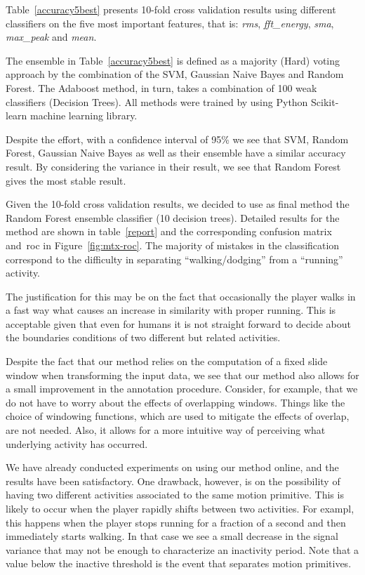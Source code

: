 Table~\ref{accuracy5best} presents 10-fold cross validation results using different classifiers on the five most important features, that is: \textit{rms}, \textit{fft\_energy}, \textit{sma}, \textit{max\_peak} and \textit{mean}. 

The ensemble in Table~\ref{accuracy5best} is defined as a majority (Hard) voting approach by the combination of the SVM, Gaussian Naive Bayes and Random Forest. The Adaboost method, in turn, takes a combination of 100 weak classifiers (Decision Trees). All methods were trained by using Python Scikit-learn machine learning library.

Despite the effort, with a confidence interval of 95\% we see that SVM, Random Forest, Gaussian Naive Bayes as well as their ensemble have a similar accuracy result. By considering the variance in their result, we see that Random Forest gives the most stable result. 

Given the 10-fold cross validation results, we decided to use as final method the Random Forest ensemble classifier (10 decision trees). Detailed results for the method are shown in table~\ref{report} and the corresponding confusion matrix and~\gls{roc} in Figure~\ref{fig:mtx-roc}. The majority of mistakes in the classification correspond to the difficulty in separating ``walking/dodging'' from  a ``running'' activity. 

The justification for this may be on the fact that occasionally the player walks in a fast way what causes an increase in similarity with proper running. This is acceptable given that even for humans it is not straight forward to decide about the boundaries conditions of two different but related activities.

Despite the fact that our method relies on the computation of a fixed slide window when transforming the input data, we see that our method also allows for a small improvement in the annotation procedure. Consider, for example, that we do not have to worry about the effects of overlapping windows. Things like the choice of windowing functions, which are used to mitigate the effects of overlap, are not needed. Also, it allows for a more intuitive way of perceiving what underlying activity has occurred.

We have already conducted experiments on using our method online, and the results have been satisfactory. One drawback, however, is on the possibility of having two different activities associated to the same motion primitive. This is likely to occur when the player rapidly shifts between two activities. For exampl, this happens when the player stops running for a fraction of a second and then immediately starts walking. In that case we see a small decrease in the signal variance that may not be enough to characterize an inactivity period. Note that a value below the inactive threshold is the event that separates motion primitives.

